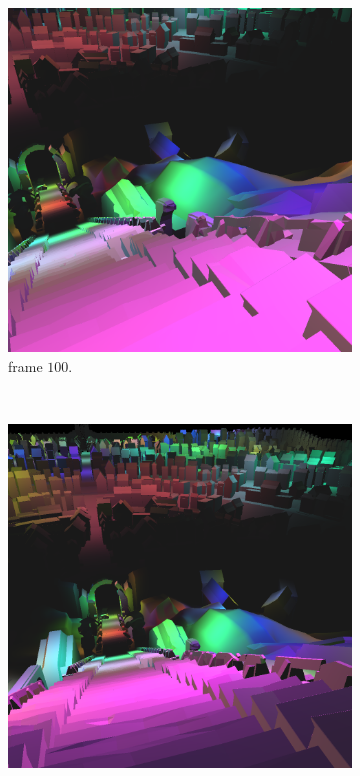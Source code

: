 \begin{figure}[tb]
\begin{subfigure}[b]{0.32\textwidth}
    \includegraphics[width=\textwidth]{./img/raw/fds-test-frames-example/zc_100.png}
    \caption{frame $100$.}
    \vspace{2pt}
    \label{fig:fds-test-frames-example:zc:100}
  \end{subfigure}\\
  \begin{subfigure}[b]{0.32\textwidth}
    \includegraphics[width=\textwidth]{./img/raw/fds-test-frames-example/zc_166.png}

\end{subfigure}
\end{figure}
